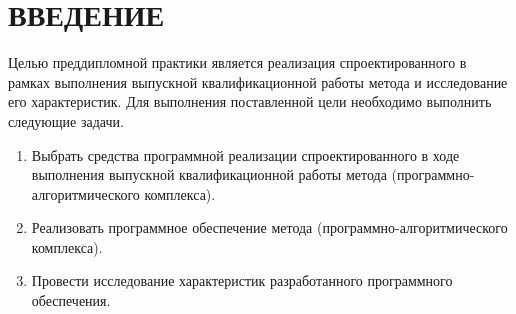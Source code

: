 \chapter*{ВВЕДЕНИЕ}

Целью преддипломной практики является реализация спроектированного в рамках выполнения выпускной квалификационной работы метода и исследование его характеристик. Для выполнения поставленной цели необходимо выполнить следующие задачи.

\begin{enumerate}
	\item Выбрать средства программной реализации спроектированного в ходе выполнения выпускной квалификационной работы метода (программно-алгоритмического комплекса).
	\item Реализовать программное обеспечение метода (программно-алгоритмического комплекса).
	\item Провести исследование характеристик разработанного программного обеспечения.
\end{enumerate}
